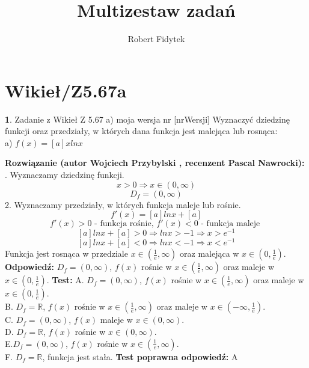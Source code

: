 \documentclass[12pt, a4paper]{article}
\title{Multizestaw zadań}
\author{Robert Fidytek}
\date{}
\theoremstyle{definition} %
\newtheorem{zad}{}
\newcommand{\kategoria}[1]{\section{#1}} %
\newcommand{\zadStart}[1]{\begin{zad}#1\newline} %
\newcommand{\zadStop}{\end{zad}}   %
\newcommand{\rozwStart}[2]{\noindent \textbf{Rozwiązanie (autor #1 , recenzent #2): }\newline} %
\newcommand{\rozwStop}{\newline}                                            %
\newcommand{\odpStart}{\noindent \textbf{Odpowiedź:}\newline}    %
\newcommand{\odpStop}{\newline}                                             %
\newcommand{\testStart}{\noindent \textbf{Test:}\newline} %
\newcommand{\testStop}{\newline} %
\newcommand{\kluczStart}{\noindent \textbf{Test poprawna odpowiedź:}\newline} %
\newcommand{\kluczStop}{\newline} %
\begin{document}
\maketitle


\kategoria{Wikieł/Z5.67a}
\zadStart{Zadanie z Wikieł Z 5.67 a) moja wersja nr [nrWersji]}
Wyznaczyć dziedzinę funkcji oraz przedziały, w których dana funkcja jest malejąca lub rosnąca:\\
a) $f(x)=[a]xlnx$
\zadStop
\rozwStart{Wojciech Przybylski}{Pascal Nawrocki}
1. Wyznaczamy dziedzinę funkcji.
$$x>0 \Rightarrow x\in(0,\infty)$$
$$D_{f}=(0,\infty)$$
2. Wyznaczamy przedziały, w których funkcja maleje lub rośnie. 
$$f'(x)=[a]lnx+[a]$$
$$f'(x)>0 \mbox{ - funkcja rośnie, } f'(x)<0 \mbox{ - funkcja maleje }$$
$$[a]lnx+[a]>0 \Rightarrow lnx>-1 \Rightarrow x>e^{-1}$$
$$[a]lnx+[a]<0 \Rightarrow lnx<-1 \Rightarrow x<e^{-1}$$
Funkcja jest rosnąca w przedziale $x\in(\frac{1}{e},\infty)$ oraz malejąca w $x\in(0,\frac{1}{e})$.
\rozwStop
\odpStart
$D_{f}=(0,\infty)$, $f(x)$ rośnie w $x\in(\frac{1}{e},\infty)$ oraz maleje w $x\in(0,\frac{1}{e})$.
\odpStop
\testStart
A. $D_{f}=(0,\infty)$, $f(x)$ rośnie w $x\in(\frac{1}{e},\infty)$ oraz maleje w $x\in(0,\frac{1}{e})$.\\
B. $D_{f}=\mathbb{R}$, $f(x)$ rośnie w $x\in(\frac{1}{e},\infty)$ oraz maleje w $x\in(-\infty,\frac{1}{e})$.\\
C. $D_{f}=(0,\infty)$, $f(x)$ maleje w $x\in(0,\infty)$.\\
D. $D_{f}=\mathbb{R}$, $f(x)$ rośnie w $x\in(0,\infty)$.\\
E.$D_{f}=(0,\infty)$, $f(x)$ rośnie w $x\in(\frac{1}{e},\infty)$.\\
F. $D_{f}=\mathbb{R}$, funkcja jest stała.
\testStop
\kluczStart
A
\kluczStop
\end{document}
